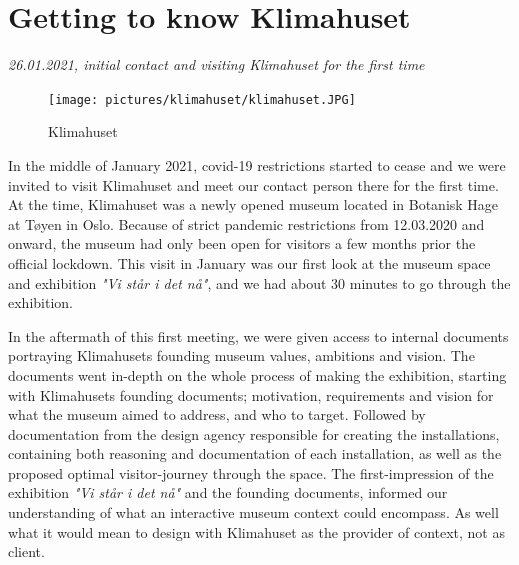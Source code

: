 
\section{Getting to know Klimahuset}
\par
\emph{26.01.2021, initial contact and visiting Klimahuset for the first time}
\par

\begin{figure}[H]
\texttt{[image: pictures/klimahuset/klimahuset.JPG]}
\caption{Klimahuset}
\centering 
\end{figure}

In the middle of January 2021, covid-19 restrictions started to cease and we were invited to visit Klimahuset and meet our contact person there for the first time. At the time, Klimahuset was a newly opened museum located in Botanisk Hage at Tøyen in Oslo. Because of strict pandemic restrictions from 12.03.2020 and onward, the museum had only been open for visitors a few months prior the official lockdown. This visit in January was our first look at the museum space and exhibition \emph{"Vi står i det nå"}, and we had about 30 minutes to go through the exhibition.


In the aftermath of this first meeting, we were given access to internal documents portraying Klimahusets founding museum values, ambitions and vision. The documents went in-depth on the whole process of making the exhibition, starting with Klimahusets founding documents; motivation, requirements and vision for what the museum aimed to address, and who to target. Followed by documentation from the design agency responsible for creating the installations, containing both reasoning and documentation of each installation, as well as the proposed optimal visitor-journey through the space. The first-impression of the exhibition \emph{"Vi står i det nå"} and the founding documents, informed our understanding of what an interactive museum context could encompass. As well what it would mean to design with Klimahuset as the provider of context, not as client.

